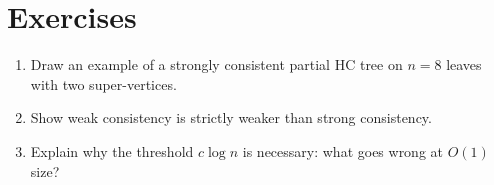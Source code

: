 \section{Exercises}

\begin{enumerate}
  \item Draw an example of a strongly consistent partial HC tree on $n=8$ leaves with two super-vertices.
  \item Show weak consistency is strictly weaker than strong consistency.
  \item Explain why the threshold $c\log n$ is necessary: what goes wrong at $O(1)$ size?
\end{enumerate}
